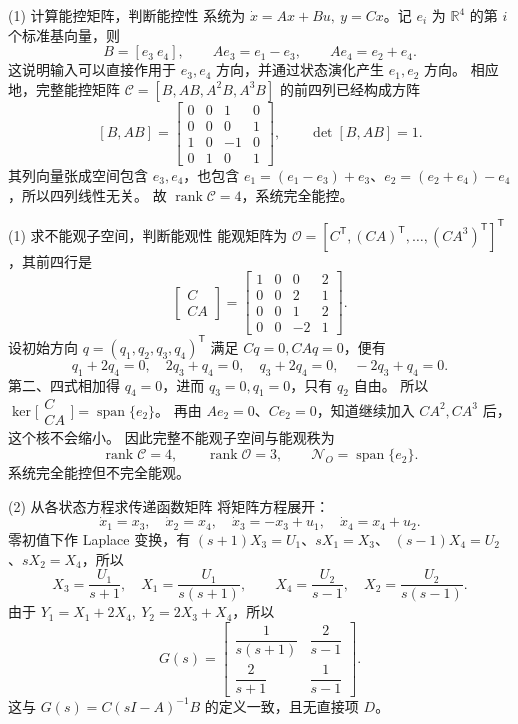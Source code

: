 \documentclass[11pt]{article}
\begin{document}
\begin{solution}
\begin{proofstep}{(1) 计算能控矩阵，判断能控性}
系统为 $\dot x=Ax+Bu,\ y=Cx$。记 $e_i$ 为 $\mathbb R^4$ 的第 $i$ 个标准基向量，则
\[
B=[e_3\ e_4],\qquad Ae_3=e_1-e_3,\qquad Ae_4=e_2+e_4.
\]
这说明输入可以直接作用于 $e_3,e_4$ 方向，并通过状态演化产生 $e_1,e_2$ 方向。
相应地，完整能控矩阵 $\mathcal C=[B,AB,A^2B,A^3B]$ 的前四列已经构成方阵
\[
[B,AB]=\begin{bmatrix}0&0&1&0\\0&0&0&1\\1&0&-1&0\\0&1&0&1\end{bmatrix},
\qquad \det[B,AB]=1.
\]
其列向量张成空间包含 $e_3,e_4$，也包含
$e_1=(e_1-e_3)+e_3$、$e_2=(e_2+e_4)-e_4$，所以四列线性无关。
故 $\operatorname{rank}\mathcal C=4$，系统完全能控。
\end{proofstep}

\begin{proofstep}{(1) 求不能观子空间，判断能观性}
能观矩阵为 $\mathcal O=[C^{\mathsf T},(CA)^{\mathsf T},\ldots,(CA^3)^{\mathsf T}]^{\mathsf T}$，其前四行是
\[
\begin{bmatrix}C\\CA\end{bmatrix}
=\begin{bmatrix}1&0&0&2\\0&0&2&1\\0&0&1&2\\0&0&-2&1\end{bmatrix}.
\]
设初始方向 $q=(q_1,q_2,q_3,q_4)^{\mathsf T}$ 满足 $Cq=0,CAq=0$，便有
\[
q_1+2q_4=0,\quad 2q_3+q_4=0,\quad q_3+2q_4=0,\quad -2q_3+q_4=0.
\]
第二、四式相加得 $q_4=0$，进而 $q_3=0,q_1=0$，只有 $q_2$ 自由。
所以 $\ker\bigl[\begin{smallmatrix}C\\CA\end{smallmatrix}\bigr]=\operatorname{span}\{e_2\}$。
再由 $Ae_2=0$、$Ce_2=0$，知道继续加入 $CA^2,CA^3$ 后，这个核不会缩小。
因此完整不能观子空间与能观秩为
\[
\boxed{\operatorname{rank}\mathcal C=4,\qquad \operatorname{rank}\mathcal O=3,\qquad
\mathcal N_O=\operatorname{span}\{e_2\}.}
\]
系统完全能控但不完全能观。
\end{proofstep}

\begin{proofstep}{(2) 从各状态方程求传递函数矩阵}
将矩阵方程展开：
\[
\dot x_1=x_3,\quad \dot x_2=x_4,\quad
\dot x_3=-x_3+u_1,\quad \dot x_4=x_4+u_2.
\]
零初值下作 Laplace 变换，有 $(s+1)X_3=U_1$、$sX_1=X_3$、
$(s-1)X_4=U_2$、$sX_2=X_4$，所以
\[
X_3=\frac{U_1}{s+1},\quad X_1=\frac{U_1}{s(s+1)},\qquad
X_4=\frac{U_2}{s-1},\quad X_2=\frac{U_2}{s(s-1)}.
\]
由于 $Y_1=X_1+2X_4,\ Y_2=2X_3+X_4$，所以
\[
\boxed{G(s)=\begin{bmatrix}
\dfrac1{s(s+1)}&\dfrac2{s-1}\\[2mm]
\dfrac2{s+1}&\dfrac1{s-1}
\end{bmatrix}.}
\]
这与 $G(s)=C(sI-A)^{-1}B$ 的定义一致，且无直接项 $D$。
\end{proofstep}


\end{solution}
\end{document}

